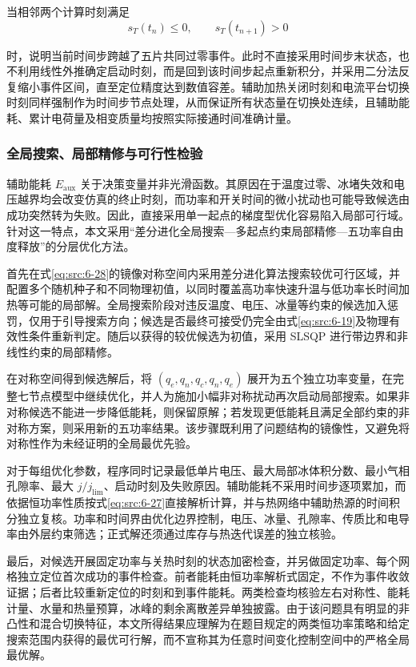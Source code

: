 \documentclass[bwprint]{gmcmthesis}
\numberwithin{equation}{section}
\numberwithin{figure}{section}
\begin{document}
 当相邻两个计算时刻满足
\begin{equation}
s_T(t_n) \leq 0, \qquad s_T(t_{n+1}) > 0 \label{eq:src:6-41}
\end{equation}

\noindent 时，说明当前时间步跨越了五片共同过零事件。此时不直接采用时间步末状态，也不利用线性外推确定启动时刻，而是回到该时间步起点重新积分，并采用二分法反复缩小事件区间，直至定位精度达到数值容差。辅助加热关闭时刻和电流平台切换时刻同样强制作为时间步节点处理，从而保证所有状态量在切换处连续，且辅助能耗、累计电荷量及相变质量均按照实际接通时间准确计量。

\subsubsection{全局搜索、局部精修与可行性检验}

 辅助能耗 \(E_{\text{aux}}\) 关于决策变量并非光滑函数。其原因在于温度过零、冰堵失效和电压越界均会改变仿真的终止时刻，而功率和开关时间的微小扰动也可能导致候选由成功突然转为失败。因此，直接采用单一起点的梯度型优化容易陷入局部可行域。针对这一特点，本文采用“差分进化全局搜索—多起点约束局部精修—五功率自由度释放”的分层优化方法。

 首先在式\eqref{eq:src:6-28}的镜像对称空间内采用差分进化算法搜索较优可行区域，并配置多个随机种子和不同物理初值，以同时覆盖高功率快速升温与低功率长时间加热等可能的局部解。全局搜索阶段对违反温度、电压、冰量等约束的候选加入惩罚，仅用于引导搜索方向；候选是否最终可接受仍完全由式\eqref{eq:src:6-19}及物理有效性条件重新判定。随后以获得的较优候选为初值，采用 SLSQP 进行带边界和非线性约束的局部精修。

 在对称空间得到候选解后，将 \((q_e, q_n, q_c, q_n, q_e)\) 展开为五个独立功率变量，在完整七节点模型中继续优化，并人为施加小幅非对称扰动再次启动局部搜索。如果非对称候选不能进一步降低能耗，则保留原解；若发现更低能耗且满足全部约束的非对称方案，则采用新的五功率结果。该步骤既利用了问题结构的镜像性，又避免将对称性作为未经证明的全局最优先验。

 对于每组优化参数，程序同时记录最低单片电压、最大局部冰体积分数、最小气相孔隙率、最大 \(j/j_{\text{lim}}\)、启动时刻及失败原因。辅助能耗不采用时间步逐项累加，而依据恒功率性质按式\eqref{eq:src:6-27}直接解析计算，并与热网络中辅助热源的时间积分独立复核。功率和时间界由优化边界控制，电压、冰量、孔隙率、传质比和电导率由外层约束筛选；正式解还须通过库存与热迭代误差的独立核验。

 最后，对候选开展固定功率与关热时刻的状态加密检查，并另做固定功率、每个网格独立定位首次成功的事件检查。前者能耗由恒功率解析式固定，不作为事件收敛证据；后者比较重新定位的时刻和到事件能耗。两类检查均核验左右对称性、能耗计量、水量和热量预算，冰峰的剩余离散差异单独披露。由于该问题具有明显的非凸性和混合切换特征，本文所得结果应理解为在题目规定的两类恒功率策略和给定搜索范围内获得的最优可行解，而不宣称其为任意时间变化控制空间中的严格全局最优解。
\end{document}
